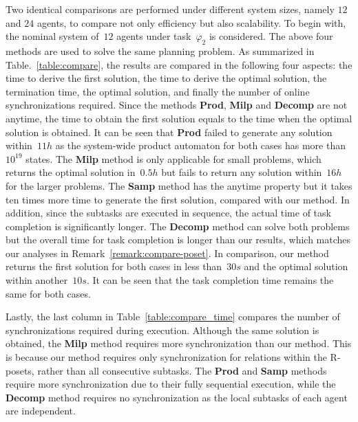 Two identical comparisons are performed under different system sizes,
namely $12$ and $24$ agents, to compare not only efficiency but also scalability.
To begin with, the nominal system of~$12$ agents under task~$\varphi_2$ is considered.
The above four methods are used to solve the same planning problem.
As summarized in Table.~\ref{table:compare},
the results are compared in the following four aspects:
the time to derive the first solution,
the time to derive the optimal solution,
the termination time, the optimal solution,
and finally the number of online synchronizations required.
Since the methods \textbf{Prod}, \textbf{Milp} and \textbf{Decomp} are not
anytime, the time to obtain  the first solution equals to the time
when the optimal solution is obtained.
It can be seen that \textbf{Prod} failed to generate any solution
within~$11h$ as the system-wide product automaton for both cases
has more than $10^{19}$ states.
The \textbf{Milp} method is only applicable for small problems,
which returns the optimal solution in~$0.5h$ but fails to
return any solution within~$16h$ for the larger problems.
The \textbf{Samp} method has the anytime property but it takes ten times
more time to generate
the first  solution, compared with our method.
In addition, since the subtasks are executed in sequence,
the actual time of task completion is significantly longer.
The \textbf{Decomp} method can solve both problems but the overall time
for task completion is longer than our results,
which matches our analyses in Remark~\ref{remark:compare-poset}.
In comparison, our method returns the first solution for both cases in less
than~$30s$ and the optimal solution within another~$10s$.
It can be seen that the task completion time remains the same for both cases.

Lastly, the last column in Table~\ref{table:compare_time} compares the number
of synchronizations required during execution.
Although the same solution is obtained, the \textbf{Milp} method requires more
synchronization than our method.
This is because our method requires only synchronization for relations within the
R-posets, rather than all consecutive subtasks.
The \textbf{Prod} and \textbf{Samp} methods require more synchronization due to
their fully sequential execution,
while the \textbf{Decomp} method requires no synchronization as
the local subtasks of each agent are independent.
